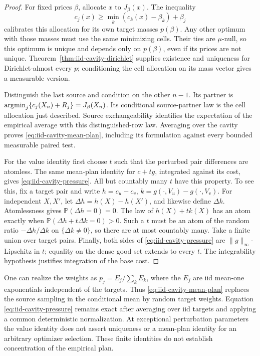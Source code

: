 \documentclass[11pt,reqno]{amsart}
\theoremstyle{definition}
\theoremstyle{remark}
\numberwithin{equation}{section}
\newcommand{\Pp}{\mathbb P}
\begin{document}
\begin{proof}
For fixed prices \(\beta\), allocate \(x\) to \(J_\beta(x)\).
The inequality
\[
 c_j(x)\ge \min_k(c_k(x)-\beta_k)+\beta_j
\]
calibrates this allocation for its own target masses \(p(\beta)\).
Any other optimum with those masses must use the same minimizing
cells. Their ties are \(\mu\)-null, so this optimum is unique and
depends only on \(p(\beta)\), even if its prices are not unique.
Theorem~\ref{thm:iid-cavity-dirichlet} supplies existence and uniqueness
for Dirichlet-almost every \(p\); conditioning the cell allocation on
its mass vector gives a measurable version.

Distinguish the last source and condition on the other \(n-1\).
Its partner is
\(\mathop{\rm argmin}_j\{c_j(X_n)+R_j\}=J_\beta(X_n)\).
Its conditional source-partner law is the cell allocation just
described. Source exchangeability identifies the expectation of the
empirical average with this distinguished-row law. Averaging over the
cavity proves \eqref{eq:iid-cavity-mean-plan}, including its formulation
against every bounded measurable paired test.

For the value identity first choose \(t\) such that the perturbed pair
differences are atomless. The same mean-plan identity for \(c+tg\),
integrated against its cost, gives
\eqref{eq:iid-cavity-pressure}. All but countably many \(t\) have this
property. To see this, fix a target pair and write
\(h=c_u-c_v\), \(k=g(\cdot,V_u)-g(\cdot,V_v)\). For independent
\(X,X'\), let \(\Delta h=h(X)-h(X')\), and likewise define
\(\Delta k\). Atomlessness gives \(\Pp(\Delta h=0)=0\).
The law of \(h(X)+tk(X)\) has an atom exactly when
\(\Pp(\Delta h+t\Delta k=0)>0\). Such a \(t\) must be an atom
of the random ratio \(-\Delta h/\Delta k\) on
\(\{\Delta k\ne0\}\), so there are at most countably many.
Take a finite union over target pairs. Finally, both sides of
\eqref{eq:iid-cavity-pressure} are \(\|g\|_\infty\)-Lipschitz in
\(t\); equality on the dense good set extends to every \(t\).
The integrability hypothesis justifies integration of the base cost.
\end{proof}

One can realize the weights as \(p_j=E_j/\sum_kE_k\), where the
\(E_j\) are iid mean-one exponentials independent of the targets.
Thus \eqref{eq:iid-cavity-mean-plan} replaces the source sampling in
the conditional mean by random target weights. Equation
\eqref{eq:iid-cavity-pressure} remains exact after averaging over iid
targets and applying a common deterministic normalization. At exceptional
perturbation parameters the value identity does not assert uniqueness
or a mean-plan identity for an arbitrary optimizer selection. These
finite identities do not establish concentration of the empirical plan.
\end{document}
